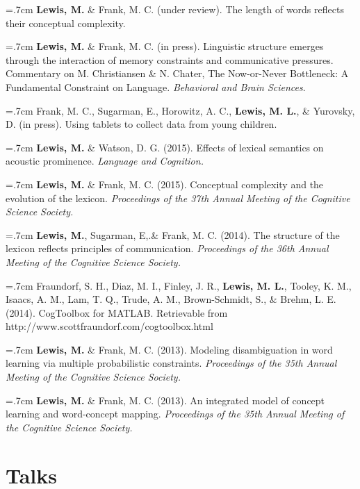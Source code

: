 \documentclass[letterpaper]{article}
\begin{document}
 \hangindent=.7cm {\bf Lewis, M.} \& Frank, M. C. (under review). The length of words reflects their conceptual complexity.
  
 \hangindent=.7cm {\bf Lewis, M.} \& Frank, M. C. (in press). Linguistic structure emerges through the interaction of memory constraints and communicative pressures. Commentary on M. Christiansen & N. Chater, The Now-or-Never Bottleneck: A Fundamental Constraint on Language. {\it Behavioral and Brain Sciences}.

  \hangindent=.7cm Frank, M. C., Sugarman, E., Horowitz, A. C., {\bf Lewis, M. L.}, \& Yurovsky, D. (in press). Using tablets to collect data from young children. 

 \hangindent=.7cm {\bf Lewis, M.} \& Watson, D. G. (2015). Effects of lexical semantics on acoustic prominence. { \it Language and Cognition.}

 \hangindent=.7cm {\bf Lewis, M.} \& Frank, M. C. (2015). Conceptual complexity and the evolution of the lexicon. { \it Proceedings of the 37th Annual Meeting of the Cognitive Science Society.}
 
 \hangindent=.7cm {\bf Lewis, M.}, Sugarman, E,.\& Frank, M. C. (2014). The structure of the lexicon reflects principles of communication. { \it Proceedings of the 36th Annual Meeting of the Cognitive Science Society.}
  
  \hangindent=.7cm Fraundorf, S. H., Diaz, M. I., Finley, J. R., {\bf Lewis, M. L.}, Tooley, K. M., Isaacs, A. M., Lam, T. Q., Trude, A. M., Brown-Schmidt, S., \& Brehm, L. E. (2014). CogToolbox for MATLAB. Retrievable from http://www.scottfraundorf.com/cogtoolbox.html
  
 \hangindent=.7cm {\bf Lewis, M.} \& Frank, M. C. (2013). Modeling disambiguation in word learning via multiple probabilistic constraints. { \it Proceedings of the 35th Annual Meeting of the Cognitive Science Society.}

 \hangindent=.7cm {\bf Lewis, M.} \& Frank, M. C. (2013). An integrated model of concept learning and word-concept mapping.{ \it Proceedings of the 35th Annual Meeting of the Cognitive Science Society.}
 
 
 
\section*{Talks}
\end{document}
